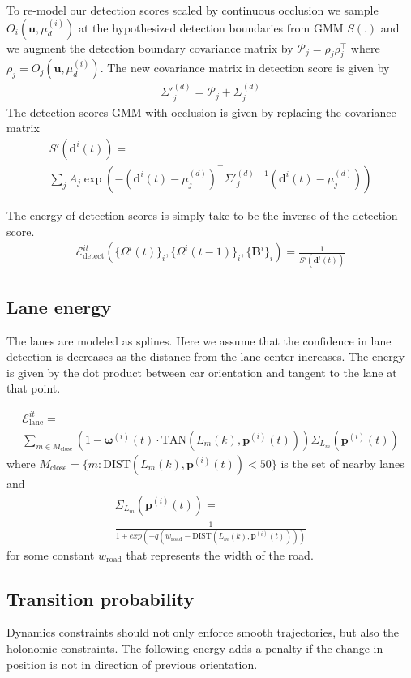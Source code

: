 \documentclass[10pt,twocolumn,letterpaper]{article}
\newcommand{\pos}[2]{\mathbf{p}^{(#1)}(#2)}
\newcommand{\ori}[2]{\mathbf{\omega}^{(#1)}(#2)}
\newcommand{\relp}[2]{\Omega^{#1}(#2)}
\newcommand{\dimsn}[1]{\mathbf{B}^{#1}}
\newcommand{\bb}[1]{\mathbf{d}^{#1}(t)}
\newcommand{\Energy}[1]{\mathcal{E}^{it}_{\text{#1}}}
\newcommand{\LaneUncertainty}[1]{\Sigma_{L_m}(#1)}
\begin{document}
To re-model our detection scores scaled by continuous occlusion we sample
$O_{i}(\mathbf{u}, \mu^{(i)}_d)$ at the hypothesized detection boundaries from
GMM $S(.)$ and we augment the detection boundary covariance matrix by
$\mathcal{P}_{j} = \rho_{j}\rho_{j}^\top$ where $\rho_{j} = O_{j}(\mathbf{u},
\mu^{(i)}_d)$. The new covariance matrix in detection score is given by 
%
\begin{align}
  \Sigma'^{(d)}_j = \mathcal{P}_{j} + \Sigma^{(d)}_j
\end{align}
%
The detection scores GMM with occlusion is given by replacing the covariance
matrix
%
\begin{multline}
  S'(\bb{i}) =\\
  \sum_j A_j \exp(-(\bb{i}-\mu^{(d)}_j)^\top \Sigma'^{(d)-1}_j
  (\bb{i}-\mu^{(d)}_j))
\end{multline}

The energy of detection scores is simply take to be the inverse of the detection score.
\begin{align}
  \Energy{detect}(\{ \relp{i}{t} \}_i, \{ \relp{i}{t-1} \}_i, \{\dimsn{i}\}_i ) = \frac{1}{S'(\bb{i})}
\end{align}

\subsection{Lane energy}
\label{sec:laneEnergy}
 The lanes are modeled as splines. Here we assume that the confidence in lane
 detection is decreases as the distance from the lane center increases.  The
 energy is given by the dot product between car orientation and tangent to the
 lane at that point.

\begin{multline}
  \label{eq:laneOrientationEnergy}
  \Energy{lane} = \\
  \sum_{m \in M_{\text{close}}}
  (1 - \ori{i}{t} \cdot \text{TAN}(L_{m}(k), \pos{i}{t}) )
\LaneUncertainty{\pos{i}{t}}
\end{multline}
where $M_{\text{close}} = \{m : \text{DIST}(L_{m}(k), \pos{i}{t}) < 50\} $ is
the set of nearby lanes and 
\begin{multline}
\LaneUncertainty{\pos{i}{t}} = \\
  \frac{1}{1 + exp(-q(w_{\text{road}} - \text{DIST}(L_{m}(k), \pos{i}{t})))}
\end{multline}
for some constant $w_{\text{road}}$ that represents the width of the road.

\subsection{Transition probability}
Dynamics constraints should not only enforce smooth trajectories, but also the
holonomic constraints.  The following energy adds a penalty if the change in
position is not in direction of previous orientation.
\end{document}
